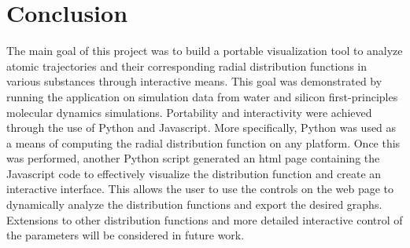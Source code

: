 \section*{Conclusion}
The main goal of this project was to build a portable visualization tool to analyze atomic trajectories and their corresponding radial distribution functions in various substances through interactive means. This goal was demonstrated by running the application on simulation data from water and silicon first-principles molecular dynamics simulations. Portability and interactivity were achieved through the use of Python and Javascript. More specifically, Python was used as a means of computing the radial distribution function on any platform. Once this was performed, another Python script generated an html page containing the Javascript code to effectively visualize the distribution function and create an interactive interface. This allows the user to use the controls on the web page to dynamically analyze the distribution functions and export the desired graphs. Extensions to other distribution functions and more detailed interactive control of the parameters will be considered in future work.